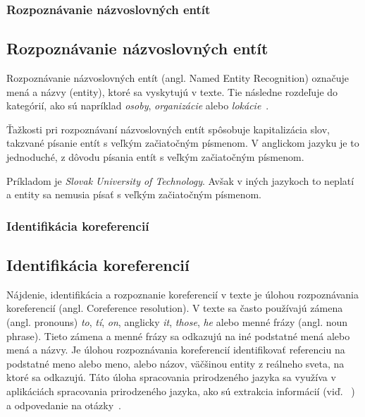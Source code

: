 %
%
{
	\subsubsection{Rozpoznávanie názvoslovných entít}
}
{
	\subsection{Rozpoznávanie názvoslovných entít}
}
\label{subsubsec:ner}
Rozpoznávanie názvoslovných entít (angl. Named Entity Recognition) označuje mená a názvy (entity), ktoré sa vyskytujú v texte. Tie následne rozdeľuje do kategórií, ako sú napríklad \textit{osoby}, \textit{organizácie} alebo \textit{lokácie}~\cite{collobert2011}.

Ťažkosti pri rozpoznávaní názvoslovných entít spôsobuje kapitalizácia slov, takzvané písanie entít s veľkým začiatočným písmenom. V anglickom jazyku je to jednoduché, z dôvodu písania entít s veľkým začiatočným písmenom.

Príkladom je \textit{Slovak University of Technology}. Avšak v iných jazykoch to neplatí a entity sa nemusia písať s veľkým začiatočným písmenom.

%
%
{
	\subsubsection{Identifikácia koreferencií}
}
{
	\subsection{Identifikácia koreferencií}
}
\label{subsubsec:corefparsing}
Nájdenie, identifikácia a rozpoznanie koreferencií v texte je úlohou rozpoznávania koreferencií (angl. Coreference resolution). V texte sa často používajú zámena (angl. pronouns) \textit{to}, \textit{tí}, \textit{on}, anglicky \textit{it}, \textit{those}, \textit{he} alebo menné frázy (angl. noun phrase). Tieto zámena a menné frázy sa odkazujú na iné podstatné mená alebo mená a názvy. Je úlohou rozpoznávania koreferencií identifikovať referenciu na podstatné meno alebo meno, alebo názov, väčšinou entity z reálneho sveta, na ktoré sa odkazujú. Táto úloha spracovania prirodzeného jazyka sa využíva v aplikáciách spracovania prirodzeného jazyka, ako sú extrakcia informácií (viď. ~) a odpovedanie na otázky~\cite{Bryl}.

